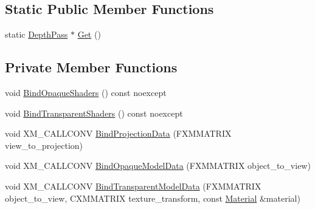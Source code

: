 \subsection*{Static Public Member Functions}
\begin{DoxyCompactItemize}
\item 
static \hyperlink{classmage_1_1_depth_pass}{Depth\+Pass} $\ast$ \hyperlink{classmage_1_1_depth_pass_a62a4f1dd404fdb43517d372537ea0e7f}{Get} ()
\end{DoxyCompactItemize}
\subsection*{Private Member Functions}
\begin{DoxyCompactItemize}
\item 
void \hyperlink{classmage_1_1_depth_pass_a235d935a39ff21340ae6301d6b2ee326}{Bind\+Opaque\+Shaders} () const noexcept
\item 
void \hyperlink{classmage_1_1_depth_pass_abe6375b4953514a8eecbfe6582843e27}{Bind\+Transparent\+Shaders} () const noexcept
\item 
void X\+M\+\_\+\+C\+A\+L\+L\+C\+O\+NV \hyperlink{classmage_1_1_depth_pass_a9fa93bf5d67b9396d358e595be55a075}{Bind\+Projection\+Data} (F\+X\+M\+M\+A\+T\+R\+IX view\+\_\+to\+\_\+projection)
\item 
void X\+M\+\_\+\+C\+A\+L\+L\+C\+O\+NV \hyperlink{classmage_1_1_depth_pass_a674fc5fe2e8cae4c704a554dc8bc1fdd}{Bind\+Opaque\+Model\+Data} (F\+X\+M\+M\+A\+T\+R\+IX object\+\_\+to\+\_\+view)
\item 
void X\+M\+\_\+\+C\+A\+L\+L\+C\+O\+NV \hyperlink{classmage_1_1_depth_pass_a3f7dae474252b416ab6ec42daf3ad9f5}{Bind\+Transparent\+Model\+Data} (F\+X\+M\+M\+A\+T\+R\+IX object\+\_\+to\+\_\+view, C\+X\+M\+M\+A\+T\+R\+IX texture\+\_\+transform, const \hyperlink{classmage_1_1_material}{Material} \&material)
\end{DoxyCompactItemize}
